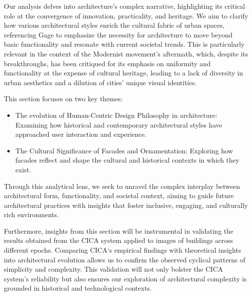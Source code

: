 Our analysis delves into architecture's complex narrative, highlighting its critical role at the convergence of innovation, practicality, and heritage.
We aim to clarify how various architectural styles enrich the cultural fabric of urban spaces, referencing Gage\cite{Gage2015} to emphasize the necessity for architecture to move beyond basic functionality and resonate with current societal trends. 
This is particularly relevant in the context of the Modernist movement's aftermath, which, despite its breakthroughs, has been critiqued for its emphasis on uniformity and functionality at the expense of cultural heritage, leading to a lack of diversity in urban aesthetics and a dilution of cities' unique visual identities\cite{Elsheshtawy1997}.

This section focuses on two key themes:

\begin{itemize}
    \item The evolution of Human-Centric Design Philosophy in architecture: Examining how historical and contemporary architectural styles have approached user interaction and experience.
    \item The Cultural Significance of Facades and Ornamentation: Exploring how facades reflect and shape the cultural and historical contexts in which they exist.
\end{itemize}

Through this analytical lens, we seek to unravel the complex interplay between architectural form, functionality, and societal context, aiming to guide future architectural practices with insights that foster inclusive, engaging, and culturally rich environments.

Furthermore, insights from this section will be instrumental in validating the results obtained from the CICA system applied to images of buildings across different epochs.
Comparing CICA`s empirical findings with theoretical insights into architectural evolution allows us to confirm the observed cyclical patterns of simplicity and complexity.
This validation will not only bolster the CICA system's reliability but also ensures our exploration of architectural complexity is grounded in historical and technological contexts.



